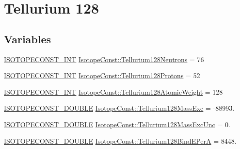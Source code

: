 \hypertarget{group___isotope_const-_tellurium-_te128}{}\section{Tellurium 128}
\label{group___isotope_const-_tellurium-_te128}
\subsection*{Variables}
\begin{DoxyCompactItemize}
\item 
\mbox{\hyperlink{group___isotope_const-_macros_ga5f18360b3e99483a35c32d789e62621c}{I\+S\+O\+T\+O\+P\+E\+C\+O\+N\+S\+T\+\_\+\+I\+NT}} \mbox{\hyperlink{group___isotope_const-_tellurium-_te128_gaa1efecc178fec266069b1595ab3d9265}{Isotope\+Const\+::\+Tellurium128\+Neutrons}} = 76
\item 
\mbox{\hyperlink{group___isotope_const-_macros_ga5f18360b3e99483a35c32d789e62621c}{I\+S\+O\+T\+O\+P\+E\+C\+O\+N\+S\+T\+\_\+\+I\+NT}} \mbox{\hyperlink{group___isotope_const-_tellurium-_te128_gae7e87c1dd3b1770cafd7445113af530f}{Isotope\+Const\+::\+Tellurium128\+Protons}} = 52
\item 
\mbox{\hyperlink{group___isotope_const-_macros_ga5f18360b3e99483a35c32d789e62621c}{I\+S\+O\+T\+O\+P\+E\+C\+O\+N\+S\+T\+\_\+\+I\+NT}} \mbox{\hyperlink{group___isotope_const-_tellurium-_te128_ga516a305cc7b657f3305520d23908d7e6}{Isotope\+Const\+::\+Tellurium128\+Atomic\+Weight}} = 128
\item 
\mbox{\hyperlink{group___isotope_const-_macros_ga8f45a7272ce02c0b4c65c44636ed719a}{I\+S\+O\+T\+O\+P\+E\+C\+O\+N\+S\+T\+\_\+\+D\+O\+U\+B\+LE}} \mbox{\hyperlink{group___isotope_const-_tellurium-_te128_ga92bbbe39f62d96ed2323e496fe485bbc}{Isotope\+Const\+::\+Tellurium128\+Mass\+Exc}} = -\/88993.
\item 
\mbox{\hyperlink{group___isotope_const-_macros_ga8f45a7272ce02c0b4c65c44636ed719a}{I\+S\+O\+T\+O\+P\+E\+C\+O\+N\+S\+T\+\_\+\+D\+O\+U\+B\+LE}} \mbox{\hyperlink{group___isotope_const-_tellurium-_te128_gafd75ab18b675b940f01bc90bfa84a45c}{Isotope\+Const\+::\+Tellurium128\+Mass\+Exc\+Unc}} = 0.
\item 
\mbox{\hyperlink{group___isotope_const-_macros_ga8f45a7272ce02c0b4c65c44636ed719a}{I\+S\+O\+T\+O\+P\+E\+C\+O\+N\+S\+T\+\_\+\+D\+O\+U\+B\+LE}} \mbox{\hyperlink{group___isotope_const-_tellurium-_te128_ga8370ddfb513b05c0d2fd9320a1614529}{Isotope\+Const\+::\+Tellurium128\+Bind\+E\+PerA}} = 8448.
\item 

\end{DoxyCompactItemize}
